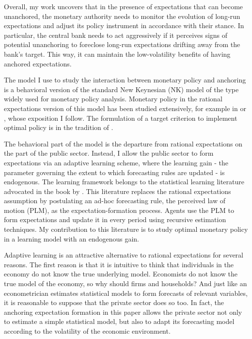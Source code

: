 \documentclass[11pt]{article}
\renewcommand{\[}{\begin{equation}}
\renewcommand{\]}{\end{equation}}
\begin{document}
Overall, my work uncovers that in the presence of expectations that can become unanchored, the monetary authority needs to monitor the evolution of long-run expectations and adjust its policy instrument in accordance with their stance. In particular, the central bank needs to act aggressively if it perceives signs of potential unanchoring to foreclose long-run expectations drifting away from the bank's target. This way, it can maintain the low-volatility benefits of having anchored expectations.  

The model I use to study the interaction between monetary policy and anchoring is a behavioral version of the standard New Keynesian (NK) model of the type widely used for monetary policy analysis. Monetary policy in the rational expectations version of this model has been studied extensively, for example in \cite{clarida1999science} or \cite{woodford2011interest}, whose exposition I follow. The formulation of a target criterion to implement optimal policy is in the tradition of \cite{svensson1999inflation}.

The behavioral part of the model is the departure from rational expectations on the part of the public sector. Instead, I allow the public sector to form expectations via an adaptive learning scheme, where the learning gain - the parameter governing the extent to which forecasting rules are updated - is endogenous. The learning framework belongs to the statistical learning literature advocated in the book by \cite{evans_honkapohja2001}. This literature replaces the rational expectations assumption by postulating an ad-hoc forecasting rule, the perceived law of motion (PLM), as the expectation-formation process. Agents use the PLM to form expectations and update it in every period using recursive estimation techniques. My contribution to this literature is to study optimal monetary policy in a learning model with an endogenous gain.

Adaptive learning is an attractive alternative to rational expectations for several reasons. The first reason is that it is intuitive to think that individuals in the economy do not know the true underlying model. Economists do not know the true model of the economy, so why should firms and households? And just like an econometrician estimates statistical models to form forecasts of relevant variables, it is reasonable to suppose that the private sector does so too. In fact, the anchoring expectation formation in this paper allows the private sector not only to estimate a simple statistical model, but also to adapt its forecasting model according to the volatility of the economic environment. 
\end{document}
